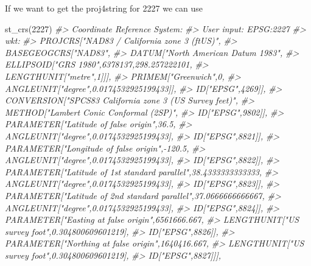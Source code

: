 \documentclass[
]{krantz}
\makeatletter
\newenvironment{Shaded}{\begin{snugshade}}{\end{snugshade}}
\newcommand{\CommentTok}[1]{\textcolor[rgb]{0.37,0.37,0.37}{\textit{#1}}}
\newcommand{\DecValTok}[1]{\textcolor[rgb]{0.06,0.06,0.06}{#1}}
\newcommand{\FunctionTok}[1]{\textcolor[rgb]{0,0,0}{#1}}
\newcommand{\NormalTok}[1]{#1}
\newenvironment{kframe}{%
\medskip{}
\setlength{\fboxsep}{.8em}
 \def\at@end@of@kframe{}%
 \ifinner\ifhmode%
  \def\at@end@of@kframe{\end{minipage}}%
  \begin{minipage}{\columnwidth}%
 \fi\fi%
 \def\FrameCommand##1{\hskip\@totalleftmargin \hskip-\fboxsep
 \colorbox{shadecolor}{##1}\hskip-\fboxsep
     \hskip-\linewidth \hskip-\@totalleftmargin \hskip\columnwidth}%
 \MakeFramed {\advance\hsize-\width
   \@totalleftmargin\z@ \linewidth\hsize
   \@setminipage}}%
 {\par\unskip\endMakeFramed%
 \at@end@of@kframe}
\renewenvironment{Shaded}{\begin{kframe}}{\end{kframe}}
\makeatother
\begin{document}
If we want to get the proj4string for 2227 we can use

\begin{Shaded}
\begin{Highlighting}[]
\FunctionTok{st\_crs}\NormalTok{(}\DecValTok{2227}\NormalTok{)}
\CommentTok{\#\textgreater{} Coordinate Reference System:}
\CommentTok{\#\textgreater{}   User input: EPSG:2227 }
\CommentTok{\#\textgreater{}   wkt:}
\CommentTok{\#\textgreater{} PROJCRS["NAD83 / California zone 3 (ftUS)",}
\CommentTok{\#\textgreater{}     BASEGEOGCRS["NAD83",}
\CommentTok{\#\textgreater{}         DATUM["North American Datum 1983",}
\CommentTok{\#\textgreater{}             ELLIPSOID["GRS 1980",6378137,298.257222101,}
\CommentTok{\#\textgreater{}                 LENGTHUNIT["metre",1]]],}
\CommentTok{\#\textgreater{}         PRIMEM["Greenwich",0,}
\CommentTok{\#\textgreater{}             ANGLEUNIT["degree",0.0174532925199433]],}
\CommentTok{\#\textgreater{}         ID["EPSG",4269]],}
\CommentTok{\#\textgreater{}     CONVERSION["SPCS83 California zone 3 (US Survey feet)",}
\CommentTok{\#\textgreater{}         METHOD["Lambert Conic Conformal (2SP)",}
\CommentTok{\#\textgreater{}             ID["EPSG",9802]],}
\CommentTok{\#\textgreater{}         PARAMETER["Latitude of false origin",36.5,}
\CommentTok{\#\textgreater{}             ANGLEUNIT["degree",0.0174532925199433],}
\CommentTok{\#\textgreater{}             ID["EPSG",8821]],}
\CommentTok{\#\textgreater{}         PARAMETER["Longitude of false origin",{-}120.5,}
\CommentTok{\#\textgreater{}             ANGLEUNIT["degree",0.0174532925199433],}
\CommentTok{\#\textgreater{}             ID["EPSG",8822]],}
\CommentTok{\#\textgreater{}         PARAMETER["Latitude of 1st standard parallel",38.4333333333333,}
\CommentTok{\#\textgreater{}             ANGLEUNIT["degree",0.0174532925199433],}
\CommentTok{\#\textgreater{}             ID["EPSG",8823]],}
\CommentTok{\#\textgreater{}         PARAMETER["Latitude of 2nd standard parallel",37.0666666666667,}
\CommentTok{\#\textgreater{}             ANGLEUNIT["degree",0.0174532925199433],}
\CommentTok{\#\textgreater{}             ID["EPSG",8824]],}
\CommentTok{\#\textgreater{}         PARAMETER["Easting at false origin",6561666.667,}
\CommentTok{\#\textgreater{}             LENGTHUNIT["US survey foot",0.304800609601219],}
\CommentTok{\#\textgreater{}             ID["EPSG",8826]],}
\CommentTok{\#\textgreater{}         PARAMETER["Northing at false origin",1640416.667,}
\CommentTok{\#\textgreater{}             LENGTHUNIT["US survey foot",0.304800609601219],}
\CommentTok{\#\textgreater{}             ID["EPSG",8827]]],}

\end{Highlighting}
\end{Shaded}
\end{document}
